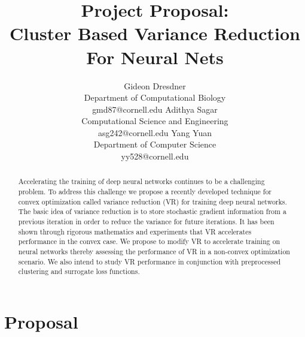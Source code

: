 \documentclass{article} %
\title{Project Proposal: \\Cluster Based Variance Reduction For Neural Nets}
\author{
Gideon Dresdner\\
Department of Computational Biology\\
gmd87@cornell.edu
\And
Adithya Sagar\\
Computational Science and Engineering\\
asg242@cornell.edu
\And
Yang Yuan  \\
Department of Computer Science\\
yy528@cornell.edu
}
\begin{document}
\maketitle


\begin{abstract}
Accelerating the training of deep neural networks continues to be a challenging problem. To address this challenge we propose a recently developed technique for convex optimization called variance reduction (VR) for training deep neural networks. The basic idea of variance reduction is to store stochastic gradient information from a previous iteration in order to reduce the variance for future iterations. It has been shown through rigorous mathematics and experiments that VR accelerates performance in the convex case. We propose to modify VR to accelerate training on neural networks thereby assessing the performance of VR in a non-convex optimization scenario.  We also intend to study VR performance in conjunction with preprocessed clustering and surrogate loss functions.
\end{abstract}

\section{Proposal}
\end{document}
